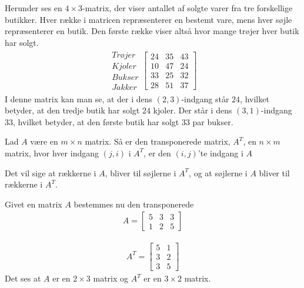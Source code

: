 \begin{eks}
Herunder ses en $4 \times 3$-matrix, der viser antallet af solgte varer fra tre forskellige butikker. Hver række i matricen repræsenterer en bestemt vare, mens hver søjle repræsenterer en butik. Den første række viser altså hvor mange trøjer hver butik har solgt.
\begin{align*}
\begin{matrix}
	Trøjer \\
	Kjoler \\
	Bukser \\
	Jakker
\end{matrix}
\begin{bmatrix}
	24 & 35 & 43 \\
	10 & 47 & 24 \\
	33 & 25 & 32 \\
	28 & 51 & 37
\end{bmatrix}
\end{align*}
I denne matrix kan man se, at der i dens $(2,3)$-indgang står $24$, hvilket betyder, at den tredje butik har solgt $24$ kjoler. Der står i dens $(3,1)$-indgang $33$, hvilket betyder, at den første butik har solgt $33$ par bukser.
\end{eks}

\begin{defn}
Lad $A$ være en $m \times n$ matrix. Så er den transponerede matrix, $A^T$, en $n \times m$ matrix, hvor hver indgang $(j,i)$ i $A^T$, er den $(i,j)$'te indgang i $A$
\label{def:(transmatrix)} 
\end{defn}
Det vil sige at rækkerne i $A$, bliver til søjlerne i $A^T$, og at søjlerne i $A$ bliver til rækkerne i $A^T$.

\begin{eks}
Givet en matrix $A$ 	bestemmes nu den transponerede
\begin{align*}
A = \begin{bmatrix}
	5 & 3 & 3 \\
	1 & 2 & 5
\end{bmatrix}
\end{align*}

\begin{align*}
A^T = \begin{bmatrix}
	5 & 1  \\
	3 & 2  \\
	3 & 5
\end{bmatrix}
\end{align*}
Det ses at $A$ er en $2 \times 3$ matrix og $A^T$ er en $3 \times 2$ matrix. 
\end{eks}


